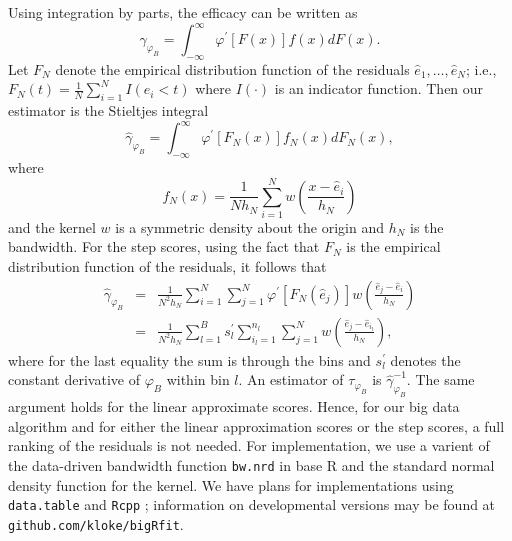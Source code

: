 Using integration by parts, the efficacy 
can be written as
\begin{displaymath}
	\gamma_{\varphi_B} = \int_{-\infty}^\infty \varphi^\prime [F(x)]f(x) dF(x).
\end{displaymath}
Let $F_N$ denote the empirical distribution function of the residuals $\widehat{e}_1, \ldots ,\widehat{e}_N$;
i.e., $F_N(t) = \frac{1}{N} \sum_{i=1}^N I(e_i < t)$ where $I(\cdot)$ is an indicator function.
Then our estimator is the Stieltjes integral
\begin{displaymath}
	\widehat{\gamma}_{\varphi_B} = \int_{-\infty}^\infty \varphi^\prime [F_N(x)]f_N(x) dF_N(x),
\end{displaymath}
where 
\begin{displaymath}
	f_N(x) = \frac{1}{Nh_N}\sum_{i=1}^Nw\left(\frac{x-\widehat{e}_i}{h_N}\right)
\end{displaymath}
and the kernel $w$ is a symmetric density about the origin and $h_N$ is the bandwidth.
For the step scores, using the fact that $F_N$ is the empirical distribution function of the residuals, it follows that
\begin{eqnarray}
	\widehat{\gamma}_{\varphi_B} & = & \frac{1}{N^2h_N} \sum_{i=1}^N \sum_{j=1}^N
	\varphi^\prime [F_N(\widehat{e}_j)]w\left(\frac{\widehat{e}_j-\widehat{e}_i}{h_N}\right) \nonumber \\
	&=& 
	\label{esteff2}
	\frac{1}{N^2h_N} \sum_{l=1}^B s_l^\prime\sum_{i_l=1}^{n_l} \sum_{j=1}^N
	w\left(\frac{\widehat{e}_j-\widehat{e}_{i_l}}{h_N}\right),
\end{eqnarray}
where for the last equality the sum is through the bins and $s_l^\prime$ denotes the constant derivative
of $\varphi_B$ within bin $l$.  An estimator of $\tau_{\varphi_B}$ is $\widehat{\gamma}_{\varphi_B}^{-1}$.
The same argument holds for the linear approximate scores.
Hence, for our big data algorithm and for either the
linear approximation scores or the step scores, a full ranking of the residuals is not needed.
For implementation,  we use a varient of the data-driven bandwidth function \texttt{bw.nrd} in base R and the
standard normal density function for the kernel.
We have plans for implementations using \verb|data.table| and \verb|Rcpp| \citep{Rcpp}; information on developmental versions may be found at \verb|github.com/kloke/bigRfit|.


